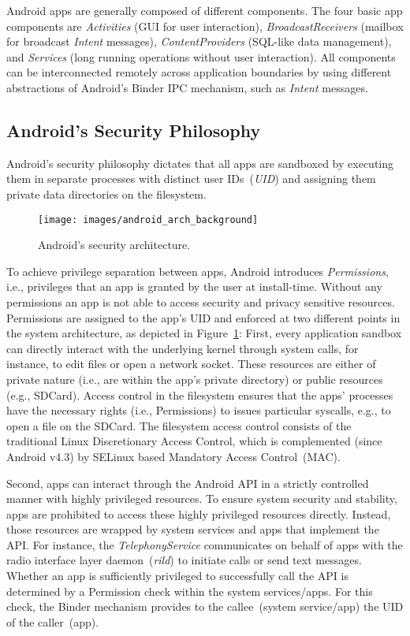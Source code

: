 \documentclass[letterpaper,twocolumn,10pt]{article}
\begin{document}
Android apps are generally composed of different components. The four basic app components are \textit{Activities} (GUI for user interaction), \textit{BroadcastReceivers} (mailbox for broadcast \textit{Intent} messages), \textit{ContentProviders} (SQL-like data management), and \textit{Services} (long running operations without user interaction). All components can be interconnected remotely across application boundaries by using different abstractions of Android's Binder IPC mechanism, such as \textit{Intent} messages.


\subsection{Android's Security Philosophy}
\label{sec:androidsec}

Android's security philosophy dictates that all apps are sandboxed by executing them in separate processes with distinct user IDs~(\textit{UID}) and assigning them private data directories on the filesystem.

\begin{figure}[t]
  \centering
  \texttt{[image: images/android\_arch\_background]}
  \caption{Android's security architecture.}
  \label{fig:background:secarch}
\end{figure}

To achieve privilege separation between apps, Android introduces \textit{Permissions}, i.e., privileges that an app is granted by the user at install-time. Without any permissions an app is not able to access security and privacy sensitive resources. Permissions are assigned to the app's UID and enforced at two different points in the system architecture, as depicted in Figure~\ref{fig:background:secarch}: First, every application sandbox can directly interact with the underlying kernel through system calls, for instance, to edit files or open a network socket. These resources are either of private nature (i.e., are within the app's private directory) or public resources (e.g., SDCard). Access control in the filesystem ensures that the apps' processes have the necessary rights (i.e., Permissions) to issues particular syscalls, e.g., to open a file on the SDCard. The filesystem access control consists of the traditional Linux Discretionary Access Control, which is complemented (since Android v4.3) by SELinux based Mandatory Access Control~(MAC).

Second, apps can interact through the Android API in a strictly controlled manner with highly privileged resources. To ensure system security and stability, apps are prohibited to access these highly privileged resources directly. Instead, those resources are wrapped by system services and apps that implement the API. For instance, the \textit{TelephonyService} communicates on behalf of apps with the radio interface layer daemon~(\textit{rild}) to initiate calls or send text messages. Whether an app is sufficiently privileged to successfully call the API is determined by a Permission check within the system services/apps. For this check, the Binder mechanism provides to the callee~(system service/app) the UID of the caller~(app).
\end{document}
